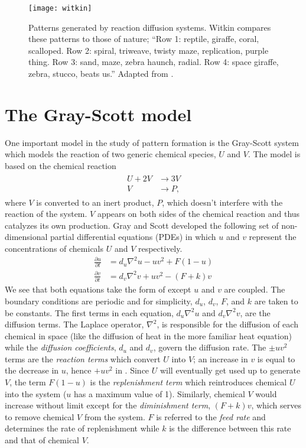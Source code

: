 \begin{figure}[h]
	\centering
	\texttt{[image: witkin]}
         \caption{Patterns generated by reaction diffusion systems. Witkin compares these patterns to those of nature; ``Row 1: reptile, giraffe, coral, scalloped. Row 2: spiral, triweave, twisty maze, replication, purple thing. Row 3: sand, maze, zebra haunch, radial. Row 4: space giraffe, zebra, stucco, beats us.'' Adapted from \protect{}.} \label{fig:witkin}
\end{figure}
	
\section{The Gray-Scott model} \label{sect:gsmodel}
	One important model in the study of pattern formation is the Gray-Scott system which models the reaction of two generic chemical species, $U$ and $V$. The model is based on the chemical reaction
	\begin{align}
	\begin{split}
		U + 2V &\rightarrow 3V \\
		V &\rightarrow P,
		\label{eq:gs-chem}
	\end{split}
	\end{align}
where $V$ is converted to an inert product, $P$, which doesn't interfere with the reaction of the system. $V$ appears on both sides of the chemical reaction and thus catalyzes its own production. Gray and Scott developed the following set of non-dimensional partial differential equations (PDEs) in which $u$ and $v$ represent the concentrations of chemicals $U$ and $V$ respectively.
	\begin{align}
		\frac{\partial u}{\partial t} & = d_u \nabla^2 u - uv^2 + F(1-u) \label{eq:gsu} \\
		\frac{\partial v}{\partial t} & = d_v \nabla^2 v  + uv^2 - (F +k)v \label{eq:gsv}
	\end{align}
We see that both equations take the form of  except $u$ and $v$ are coupled. The boundary conditions are periodic and for simplicity, $d_u$, $d_v$, $F$, and $k$ are taken to be constants. The first terms in each equation, $d_u \nabla^2 u$ and $d_v \nabla^2 v$, are the diffusion terms. The Laplace operator, $\nabla^2$, is responsible for the diffusion of each chemical in space (like the diffusion of heat in the more familiar heat equation) while the \textit{diffusion coefficients}, $d_u$ and $d_v$, govern the diffusion rate. The $\pm uv^2$ terms are the  \textit{reaction terms} which convert $U$ into $V$; an increase in $v$ is equal to the decrease in $u$, hence $+uv^2$ in . Since $U$ will eventually get used up to generate $V$, the term $F(1-u)$ is the \textit{replenishment term} which reintroduces chemical $U$ into the system ($u$ has a maximum value of 1). Similarly, chemical $V$ would increase without limit except for the \textit{diminishment term}, $(F+k)v$, which serves to remove chemical $V$ from the system. $F$ is referred to the \textit{feed rate} and determines the rate of replenishment while $k$ is the difference between this rate and that of chemical $V$.

